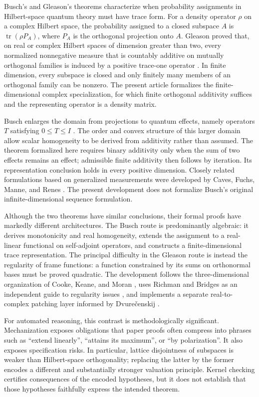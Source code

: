 \documentclass[pdflatex,sn-mathphys-num]{sn-jnl}
\theoremstyle{thmstyleone}
\theoremstyle{thmstylethree}
\begin{document}
Busch's and Gleason's theorems characterize when probability assignments in Hilbert-space quantum theory must have trace form. For a density operator \(\rho\) on a complex Hilbert space, the probability assigned to a closed subspace \(A\) is \(\operatorname{tr}(\rho P_A)\), where \(P_A\) is the orthogonal projection onto \(A\). Gleason proved that, on real or complex Hilbert spaces of dimension greater than two, every normalized nonnegative measure that is countably additive on mutually orthogonal families is induced by a positive trace-one operator \cite{gleason1957}. In finite dimension, every subspace is closed and only finitely many members of an orthogonal family can be nonzero. The present article formalizes the finite-dimensional complex specialization, for which finite orthogonal additivity suffices and the representing operator is a density matrix.

Busch enlarges the domain from projections to quantum effects, namely operators \(T\) satisfying \(0\leq T\leq I\) \cite{busch2003}. The order and convex structure of this larger domain allow scalar homogeneity to be derived from additivity rather than assumed. The theorem formalized here requires binary additivity only when the sum of two effects remains an effect; admissible finite additivity then follows by iteration. Its representation conclusion holds in every positive dimension. Closely related formulations based on generalized measurements were developed by Caves, Fuchs, Manne, and Renes \cite{caves2004}. The present development does not formalize Busch's original infinite-dimensional sequence formulation.

Although the two theorems have similar conclusions, their formal proofs have markedly different architectures. The Busch route is predominantly algebraic: it derives monotonicity and real homogeneity, extends the assignment to a real-linear functional on self-adjoint operators, and constructs a finite-dimensional trace representation. The principal difficulty in the Gleason route is instead the regularity of frame functions: a function constrained by its sums on orthonormal bases must be proved quadratic. The development follows the three-dimensional organization of Cooke, Keane, and Moran \cite{cooke1985}, uses Richman and Bridges as an independent guide to regularity issues \cite{richman1999}, and implements a separate real-to-complex patching layer informed by Dvure\v{c}enskij \cite{dvurecenskij1993}.

For automated reasoning, this contrast is methodologically significant. Mechanization exposes obligations that paper proofs often compress into phrases such as ``extend linearly'', ``attains its maximum'', or ``by polarization''. It also exposes specification risks. In particular, lattice disjointness of subspaces is weaker than Hilbert-space orthogonality; replacing the latter by the former encodes a different and substantially stronger valuation principle. Kernel checking certifies consequences of the encoded hypotheses, but it does not establish that those hypotheses faithfully express the intended theorem.
\end{document}
